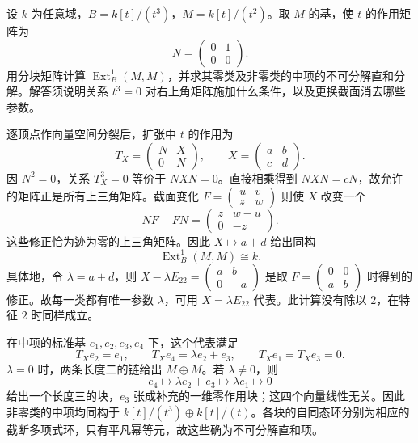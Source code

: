 \begin{optionalexercise}\label{b5:ex:09-truncated-cubic-self-extensions}
	设 \(k\) 为任意域，\(B=k[t]/(t^3)\)，\(M=k[t]/(t^2)\)。取 \(M\) 的基，使 \(t\) 的作用矩阵为
	\[
		N=\begin{pmatrix}0&1\\0&0\end{pmatrix}.
	\]
	用分块矩阵计算 \(\operatorname{Ext}^1_B(M,M)\)，并求其零类及非零类的中项的不可分解直和分解。解答须说明关系 \(t^3=0\) 对右上角矩阵施加什么条件，以及更换截面消去哪些参数。
\end{optionalexercise}
\begin{solution}
	逐顶点作向量空间分裂后，扩张中 \(t\) 的作用为
	\[
		T_X=\begin{pmatrix}N&X\\0&N\end{pmatrix},\qquad X=\begin{pmatrix}a&b\\c&d\end{pmatrix}.
	\]
	因 \(N^2=0\)，关系 \(T_X^3=0\) 等价于 \(NXN=0\)。直接相乘得到 \(NXN=cN\)，故允许的矩阵正是所有上三角矩阵。截面变化 \(F=\left(\begin{smallmatrix}u&v\\z&w\end{smallmatrix}\right)\) 则使 \(X\) 改变一个
	\[
		NF-FN=\begin{pmatrix}z&w-u\\0&-z\end{pmatrix}.
	\]
	这些修正恰为迹为零的上三角矩阵。因此 \(X\mapsto a+d\) 给出同构
	\[
		\operatorname{Ext}^1_B(M,M)\cong k.
	\]
	具体地，令 \(\lambda=a+d\)，则 \(X-\lambda E_{22}=\left(\begin{smallmatrix}a&b\\0&-a\end{smallmatrix}\right)\) 是取 \(F=\left(\begin{smallmatrix}0&0\\a&b\end{smallmatrix}\right)\) 时得到的修正。故每一类都有唯一参数 \(\lambda\)，可用 \(X=\lambda E_{22}\) 代表。此计算没有除以 \(2\)，在特征 \(2\) 时同样成立。

	在中项的标准基 \(e_1,e_2,e_3,e_4\) 下，这个代表满足
	\[
		T_Xe_2=e_1,\qquad T_Xe_4=\lambda e_2+e_3,\qquad T_Xe_1=T_Xe_3=0.
	\]
	\(\lambda=0\) 时，两条长度二的链给出 \(M\oplus M\)。若 \(\lambda\ne0\)，则
	\[
		e_4\longmapsto\lambda e_2+e_3\longmapsto\lambda e_1\longmapsto0
	\]
	给出一个长度三的块，\(e_3\) 张成补充的一维零作用块；这四个向量线性无关。因此非零类的中项均同构于 \(k[t]/(t^3)\oplus k[t]/(t)\)。各块的自同态环分别为相应的截断多项式环，只有平凡幂等元，故这些确为不可分解直和项。
\end{solution}

